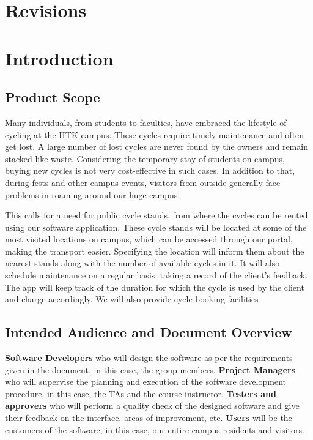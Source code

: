 \documentclass{scrreprt}
\begin{document}
\tableofcontents

\chapter{Revisions}

\chapter{Introduction}
\section{Product Scope}
Many individuals, from students to faculties, have embraced the lifestyle of cycling at the IITK campus. These cycles require timely maintenance and often get lost. A large number of lost cycles are never found by the owners and remain stacked like waste. Considering the temporary stay of students on campus, buying new cycles is not very cost-effective in such cases. In addition to that, during fests and other campus events, visitors from outside generally face problems in roaming around our huge campus.

This calls for a need for public cycle stands, from where the cycles can be rented using our  software application. These cycle stands will be located at some of the most visited locations on campus, which can be accessed through our portal, making the transport easier. Specifying the location will inform them about the nearest stands along with the number of available cycles in it.
It will also schedule maintenance on a regular basis, taking a record of the client’s feedback. The app will keep track of the duration for which the cycle is used by the client and charge accordingly. We will also provide cycle booking facilities

\section{Intended Audience and Document Overview}
\textbf{Software Developers} who will design the software as per the requirements given in the document, in this case, the group members. \textbf{Project Managers} who will supervise the planning and execution of the software development procedure, in this case, the TAs and the course instructor. \textbf{Testers and approvers} who will perform a quality check of the designed software and give their feedback on the interface, areas of improvement, etc. \textbf{Users} will be the customers of the software, in this case, our entire campus residents and visitors.
\end{document}
